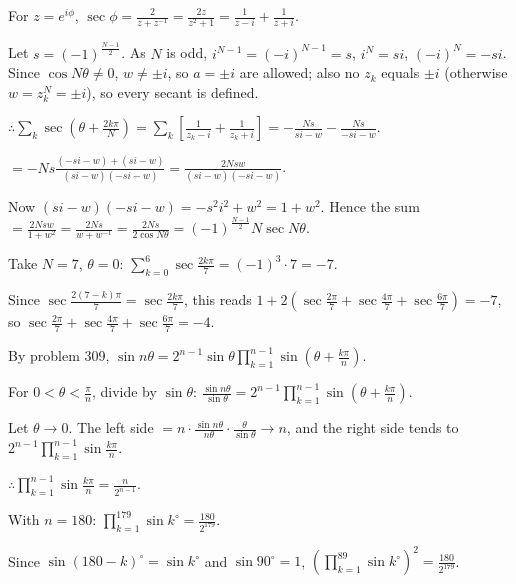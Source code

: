   For $z = e^{i\phi}$, $\sec\phi = \frac{2}{z + z^{-1}} = \frac{2z}{z^2 + 1} = \frac{1}{z - i} + \frac{1}{z
    + i}$.

  Let $s = (-1)^{\frac{N - 1}{2}}$. As $N$ is odd, $i^{N - 1} = (-i)^{N - 1} = s$, $i^N = si$, $(-i)^N =
  -si$. Since $\cos N\theta\neq 0$, $w\neq\pm i$, so $a = \pm i$ are allowed; also no $z_k$ equals $\pm i$
  (otherwise $w = z_k^N = \pm i$), so every secant is defined.

  $\therefore \displaystyle\sum_{k}\sec\left(\theta + \frac{2k\pi}{N}\right) = \sum_k\left[\frac{1}{z_k - i}
  + \frac{1}{z_k + i}\right] = -\frac{Ns}{si - w} - \frac{Ns}{-si - w}$.

  $= -Ns\frac{(-si - w) + (si - w)}{(si - w)(-si - w)} = \frac{2Nsw}{(si - w)(-si - w)}$.

  Now $(si - w)(-si - w) = -s^2i^2 + w^2 = 1 + w^2$. Hence the sum $= \frac{2Nsw}{1 + w^2} = \frac{2Ns}{w
    + w^{-1}} = \frac{2Ns}{2\cos N\theta} = (-1)^{\frac{N - 1}{2}}N\sec N\theta$.

  Take $N = 7$, $\theta = 0$: $\displaystyle\sum_{k = 0}^{6}\sec\frac{2k\pi}{7} = (-1)^3\cdot 7 = -7$.

  Since $\sec\frac{2(7 - k)\pi}{7} = \sec\frac{2k\pi}{7}$, this reads $1 + 2\left(\sec\frac{2\pi}{7}
  + \sec\frac{4\pi}{7} + \sec\frac{6\pi}{7}\right) = -7$, so $\sec\frac{2\pi}{7} + \sec\frac{4\pi}{7}
  + \sec\frac{6\pi}{7} = -4$.
\item By problem 309, $\sin n\theta = 2^{n - 1}\sin\theta\displaystyle\prod_{k = 1}^{n - 1}\sin\left(\theta
  + \frac{k\pi}{n}\right)$.

  For $0 < \theta < \frac{\pi}{n}$, divide by $\sin\theta$: $\frac{\sin n\theta}{\sin\theta} = 2^{n -
    1}\displaystyle\prod_{k = 1}^{n - 1}\sin\left(\theta + \frac{k\pi}{n}\right)$.

  Let $\theta\rightarrow 0$. The left side $= n\cdot\frac{\sin n\theta}{n\theta}\cdot\frac{\theta}{\sin\theta}
  \rightarrow n$, and the right side tends to $2^{n - 1}\displaystyle\prod_{k = 1}^{n - 1}\sin\frac{k\pi}{n}$.

  $\therefore \displaystyle\prod_{k = 1}^{n - 1}\sin\frac{k\pi}{n} = \frac{n}{2^{n - 1}}$.

  With $n = 180$: $\displaystyle\prod_{k = 1}^{179}\sin k^\circ = \frac{180}{2^{179}}$.

  Since $\sin(180 - k)^\circ = \sin k^\circ$ and $\sin90^\circ = 1$, $\left(\displaystyle\prod_{k = 1}^{89}\sin
  k^\circ\right)^2 = \frac{180}{2^{179}}$.

